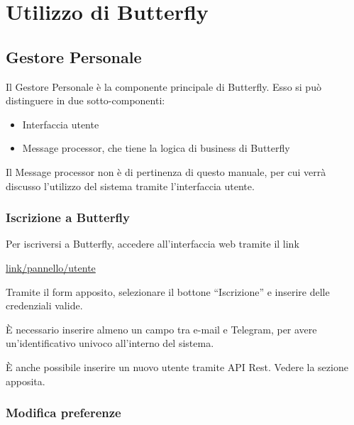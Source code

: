 \section{Utilizzo di Butterfly}\label{utilizzo}


\subsection{Gestore Personale}

Il Gestore Personale è la componente principale di Butterfly. %
Esso si può distinguere in due sotto-componenti:

\begin{itemize}
    \item Interfaccia utente
    \item Message processor, che tiene la logica di business di Butterfly
\end{itemize}

Il Message processor non è di pertinenza di questo manuale, per cui verrà discusso l'utilizzo del sistema tramite
l'interfaccia utente.


\subsubsection{Iscrizione a Butterfly}

Per iscriversi a Butterfly, accedere all'interfaccia web tramite il link

\begin{center}
    \url{link/pannello/utente}
\end{center}

Tramite il form apposito, selezionare il bottone ``Iscrizione'' e inserire delle credenziali valide.

È necessario inserire almeno un campo tra e-mail e Telegram, per avere un'identificativo univoco
all'interno del sistema.

È anche possibile inserire un nuovo utente tramite API Rest. Vedere la sezione apposita.


\subsubsection{Modifica preferenze}


